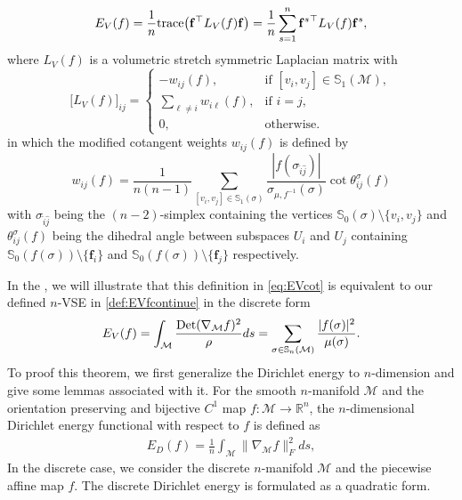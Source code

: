 \documentclass{article}
\begin{document}
\begin{align} \label{eq:EVcot}
    E_V(f) = \frac{1}{n} \mathrm{trace} \big( \mathbf{f}^\top L_V(f) \mathbf{f} \big) = \frac{1}{n} \sum_{s = 1}^n {\mathbf{f}^{s}}^\top L_V(f) \mathbf{f}^s,
\end{align}
where $L_V(f)$ is a volumetric stretch symmetric Laplacian matrix with
\begin{subequations}
\begin{equation} \label{eq:LVf}
    \big[ L_V(f) \big]_{ij} = \begin{cases}
    -w_{ij}(f), & \text{if } [v_i,v_j]\in \mathbb{S}_1(\mathcal{M}),\\
    \sum_{\ell \neq i} w_{i\ell}(f), & \text{if } i = j,\\
    0, & \text{otherwise}.
    \end{cases}
\end{equation}
\end{subequations}
in which the modified cotangent weights $w_{ij}(f)$ is defined by
\begin{subequations}
\begin{equation} \label{eq:wijf}
    w_{ij}(f) = \frac{1}{n(n-1)} \sum_{[v_i,v_j] \in \mathbb{S}_1(\sigma)} \frac{|f(\sigma_{\hat{i}\hat{j}})|}{\sigma_{\mu,f^{-1}}(\sigma)} \cot\theta_{ij}^{\sigma}(f)
\end{equation}
\end{subequations}
with $\sigma_{\hat{i}\hat{j}}$ being the $(n-2)$-simplex containing the vertices $\mathbb{S}_0(\sigma)\setminus \{v_i,v_j\}$ and
$\theta_{ij}^\sigma(f)$ being the dihedral angle between subspaces $U_i$ and $U_j$ containing $\mathbb{S}_0(f(\sigma))\setminus \{\mathbf{f}_i\}$ and $\mathbb{S}_0(f(\sigma))\setminus \{\mathbf{f}_j\}$ respectively.

In the , we will illustrate that this definition in \eqref{eq:EVcot} is equivalent to our defined $n$-VSE in \eqref{def:EVfcontinue} in the discrete form
\begin{align}
    E_V(f) = \int_\mathcal{M} \frac{{\rm Det}(\nabla_\mathcal{M} f)^2}{\rho} ds =  \sum_{\sigma\in \mathbb{S}_n(\mathcal{M}) } \frac{|f(\sigma)|^2}{\mu(\sigma)}.
\end{align}
To proof this theorem, we first generalize the Dirichlet energy to $n$-dimension and give some lemmas associated with it. For the smooth $n$-manifold $\mathcal{M}$ and the orientation preserving and bijective $C^1$ map $f:\mathcal{M}\to \mathbb{R}^n$, the $n$-dimensional Dirichlet energy functional with respect to $f$ is defined as
\begin{align} \label{def:ndDirichlet}
    E_D(f)
    = \frac{1}{n}\int_{\mathcal{M}} \|\nabla_\mathcal{M} f\|_F^2 ds,
\end{align}
In the discrete case, we consider the discrete $n$-manifold $\mathcal{M}$ and the piecewise affine map $f$. The discrete Dirichlet energy is formulated as a quadratic form.
\end{document}
